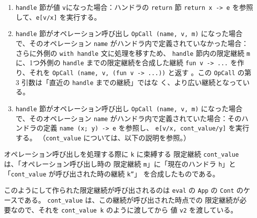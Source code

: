 \begin{enumerate}
\item \texttt{handle} 節が値 \texttt{v}になった場合：ハンドラの \texttt{return} 節 \texttt{return x -> e} を参照して、\texttt{e[v/x]} を実行する。
\item \texttt{handle} 節がオペレーション呼び出し \texttt{OpCall (name, v, m)} になった場合で、そのオペレーション \texttt{name} がハンドラ内で定義されていなかった場合：
さらに外側の \texttt{with handle} 文に処理を移すため、
\texttt{handle} 節内の限定継続 \texttt{m} に、1つ外側の \texttt{handle} までの限定継続を合成した継続 \texttt{fun v -> ...} を作り、それを \texttt{OpCall (name, v, (fun v -> ...))} と返す
。この \texttt{OpCall} の第 3 引数は「直近の \texttt{handle} までの継続」ではな
く、より広い継続となっている。

\item \texttt{handle} 節がオペレーション呼び出し \texttt{OpCall (name, v, m)} になった場合で、そのオペレーション \texttt{name} がハンドラ内で定義されていた場合：そのハンドラの定義 \texttt{name (x; y) -> e} を参照し、
\texttt{e[v/x, cont\_value/y]} を実行する。
（\texttt{cont\_value} については、以下の説明を参照。）
\end{enumerate}

オペレーション呼び出しを処理する際に \texttt{k} に束縛する
限定継続 \texttt{cont\_value} は、「オペレーション呼び出し時の
限定継続 \texttt{m}」に「現在のハンドラ \texttt{h}」と
「\texttt{cont\_value} が呼び出された時の継続 \texttt{k''}」
を合成したものである。

このようにして作られた限定継続が呼び出されるのは \texttt{eval} の
\texttt{App} の \texttt{Cont} のケースである。
\texttt{cont\_value} は、この継続が呼び出された時点での
限定継続が必要なので、それを \texttt{cont\_value k} のように渡してから
値 \texttt{v2} を渡している。

